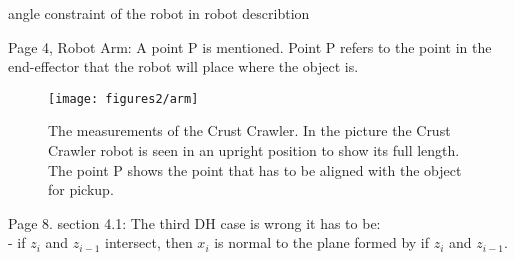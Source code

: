 

angle constraint of the robot in robot describtion

Page 4, Robot Arm: A point P is mentioned.
Point P refers to the point in the end-effector that the robot will place where the object is.
\begin{figure}[H]
	\centering
	\texttt{[image: figures2/arm]}
	\caption{The measurements of the Crust Crawler. In the picture the Crust Crawler robot is seen in an upright position to show its full length. The point P shows the point that has to be aligned with the object for pickup.}
	\label{fig:arm}
\end{figure}


Page 8. section 4.1:
The third DH case is wrong it has to be:\\
- if $z_i$ and $z_{i-1}$ intersect, then $x_i$ is normal to the plane formed by if $z_i$ and $z_{i-1}$.
%
%
%
%
%
%
%
%
%
%
%
%
%
%
%
%
%
%
%
%
%
%
%
%
%
%
%
%
%
%


